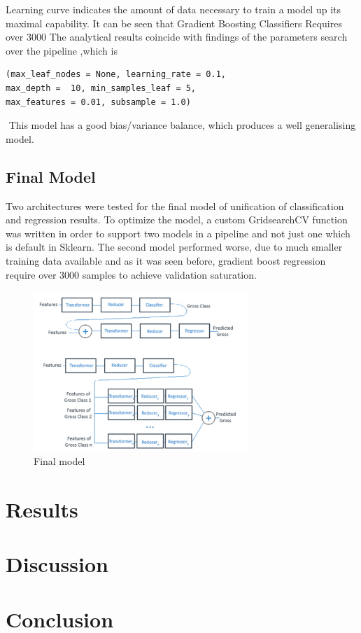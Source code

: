 Learning curve indicates the amount of data necessary to train a model up its maximal capability. It can be seen that Gradient Boosting Classifiers Requires over 3000
The analytical results coincide with findings of the parameters search over the pipeline ,which is \begin{verbatim}(max_leaf_nodes = None, learning_rate = 0.1,
max_depth =  10, min_samples_leaf = 5, 
max_features = 0.01, subsample = 1.0) \end{verbatim}­ This model has a good bias/variance balance, which produces a well generalising model.

\subsection{Final Model}
Two architectures were tested for the final model of unification of classification and regression results. To optimize the model, a custom GridsearchCV function was written in order to support two models in a pipeline and not just one which is default in Sklearn.
The second model performed worse, due to much smaller training data available and as it was seen before, gradient boost regression require over 3000 samples to achieve validation saturation.
\begin{figure}[h]
\centering
\includegraphics[width=3.2in]{figures/final_model}
\caption{Final model}
\label{fig:finalmodel}
\end{figure}

\section{Results}
\blindtext[2]
\section{Discussion}
\blindtext[2]
\section{Conclusion}
\blindtext[1]